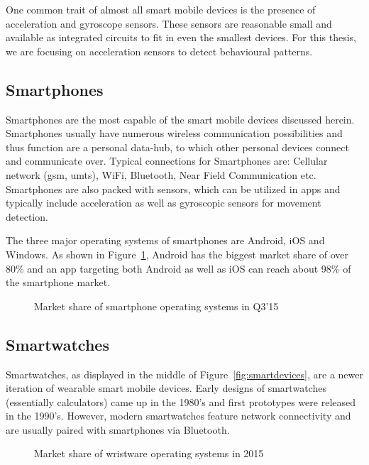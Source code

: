 One common trait of almost all smart mobile devices is the presence of acceleration and gyroscope sensors. These sensors are reasonable small and available as integrated circuits to fit in even the smallest devices. For this thesis, we are focusing on acceleration sensors to detect behavioural patterns.

\subsection{Smartphones}
Smartphones are the most capable of the smart mobile devices discussed herein. Smartphones usually have numerous wireless communication possibilities and thus function are a personal data-hub, to which other personal devices connect and communicate over. Typical connections for Smartphones are: Cellular network (\eg \acrshort{gsm}, \acrshort{umts}), WiFi, Bluetooth, Near Field Communication etc. Smartphones are also packed with sensors, which can be utilized in \glspl{app} and typically include acceleration as well as gyroscopic sensors for movement detection.

The three major operating systems of smartphones are Android, iOS and Windows. As shown in Figure~\ref{fig:smartphoneosmarketshare}, Android has the biggest market share of over 80\% and an \gls{app} targeting both Android as well as iOS can reach about 98\% of the smartphone market.

\begin{figure}
    \centering
    
    \caption{Market share of smartphone operating systems in Q3'15 \cite{gartner2015smartosmarketshare}}
    \label{fig:smartphoneosmarketshare}
\end{figure}

\subsection{Smartwatches}
Smartwatches, as displayed in the middle of Figure~\ref{fig:smartdevices}, are a newer iteration of wearable smart mobile devices. Early designs of smartwatches (essentially calculators) came up in the 1980's and first prototypes were released in the 1990's. However, modern smartwatches feature network connectivity and are usually paired with smartphones via Bluetooth.

\begin{figure}
    \centering
    
    \caption{Market share of wristware operating systems in 2015 \cite{idc2015wristmarketshare}}
    \label{fig:watchmarketshare}
\end{figure}

